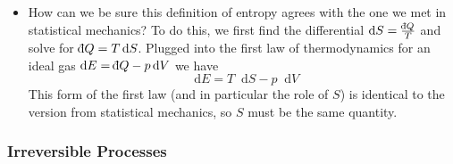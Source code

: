 \documentclass[11pt, a4paper]{article}
\newcommand{\diff}{\mathop{}\!\mathrm{d}} %
\newcommand{\dbar}{{\mathchar '26\mkern -11mu \mathrm{d}}} %
\begin{document}
\begin{itemize}
	\item How can we be sure this definition of entropy agrees with the one we met in statistical mechanics? To do this, we first find the differential $ \diff S = \frac{\dbar Q}{T} $ and solve for $ \dbar Q = T \diff S $. Plugged into the first law of thermodynamics for an ideal gas $ \diff E = \dbar Q - p \diff V $ we have 
	\begin{equation*}
		\diff E = T \diff S - p \diff V
	\end{equation*}
	This form of the first law (and in particular the role of $ S $) is identical to the version from statistical mechanics, so $ S $ must be the same quantity.
\end{itemize}

\subsubsection{Irreversible Processes}
\end{document}
